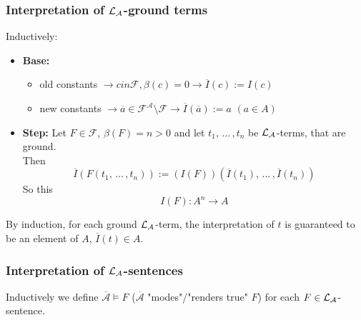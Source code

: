 
\subsubsection{Interpretation of $\mathcal{L}_\mathcal{A}$-ground terms}

Inductively:
\begin{itemize}
	\item \textbf{Base:} 
	\begin{itemize}
		\item old constants $\rightarrow c in \mathcal{F}, \beta(c) = 0 \rightarrow \overline I (c) := I(c)$ 
		\item new constants $\rightarrow \overline a \in \mathcal{F}^\mathcal{A} \setminus \mathcal{F} \rightarrow \overline I (\overline a) := a$ $(a \in A)$
	\end{itemize} \nn
	
	\item \textbf{Step:} Let $F \in \mathcal{F}$, $\beta (F) = n > 0$ and let $t_1, \, \dots \, , t_n$ be $\mathcal{L}_\mathcal{A}$-terms, that are ground.\\
	Then 
	$$\overline I (F(t_1, \, \dots \, , t_n)) := (I(F))(\overline I (t_1), \, \dots \, , \overline I (t_n)) $$
	So this 
	$$ I(F): A^n \rightarrow A $$
\end{itemize}

By induction, for each ground $\mathcal{L}_\mathcal{A}$-term, the interpretation of $t$ is guaranteed to be an element of $A$, $\overline I (t) \in A$.\\

\newpage

\subsubsection{Interpretation of $\mathcal{L}_\mathcal{A}$-sentences}

Inductively we define $\overline{\mathcal{A}} \models F$ ($\overline{\mathcal{A}}$ "modes"/"renders true" $F$) for each $F \in \mathcal{L}_\mathcal{A}$-sentence.\\

